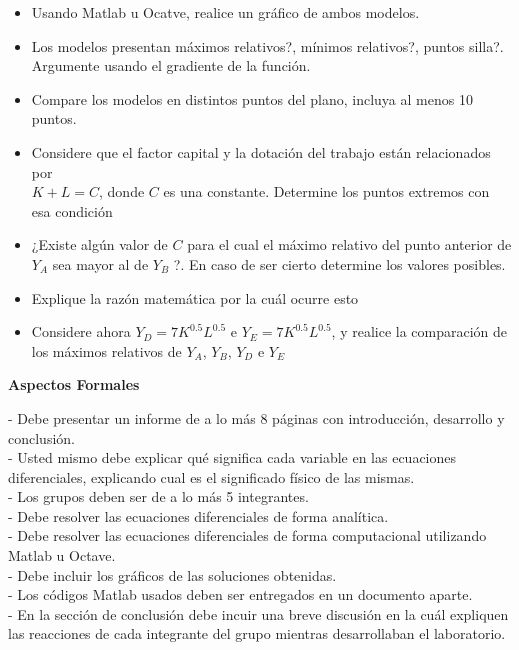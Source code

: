 \documentclass{article}
\theoremstyle{definition}
\begin{document}
\begin{itemize}
    \item Usando Matlab u Ocatve, realice un gráfico de ambos modelos.
    \item Los modelos presentan máximos relativos?, mínimos relativos?, puntos silla?. Argumente usando el gradiente de la función. 
    \item Compare los modelos en distintos puntos del plano, incluya al menos 10 puntos.
    \item Considere que el factor capital y la dotación del trabajo están relacionados por \\$K+L=C$, donde $C$ es una constante. Determine  los puntos extremos con esa condición
    \item ¿Existe algún valor de $C$ para el cual el máximo relativo del punto anterior de $Y_A$ sea mayor al de $Y_B$ ?. En caso de ser cierto determine los valores posibles.
    \item Explique la razón matemática por la cuál ocurre esto 
    \item Considere ahora $Y_D = 7K^{0.5}L^{0.5}$ e $Y_E = 7K^{0.5}L^{0.5}$, y realice la comparación de los máximos relativos de $Y_A$, $Y_B$, $Y_D$ e $Y_E$
\end{itemize}









\newpage


\begin{center}
\textbf{Aspectos Formales}
\end{center}

- Debe presentar un informe de a lo más 8 páginas con introducción, desarrollo y conclusión. \\

- Usted mismo debe explicar qué significa cada variable en las ecuaciones diferenciales, explicando cual es el significado físico de las mismas. \\

- Los grupos deben ser de a lo más 5 integrantes. \\

- Debe resolver las ecuaciones diferenciales de forma analítica. \\

- Debe resolver las ecuaciones diferenciales de forma computacional utilizando Matlab u Octave. \\

- Debe incluir los gráficos de las soluciones obtenidas.\\

- Los códigos Matlab usados deben ser entregados en un documento aparte. \\

- En la sección de conclusión debe incuir una breve discusión en la cuál expliquen las reacciones de cada integrante del grupo mientras desarrollaban el laboratorio. \\
\end{document}
